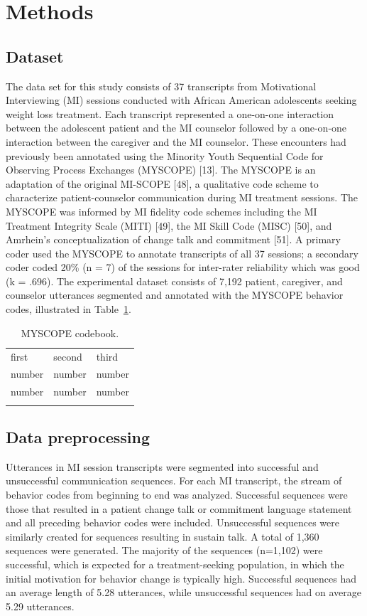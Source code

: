\section{Methods}
\label{sec:methods}
\subsection{Dataset}
\label{subsec:dataset}
The data set for this study consists of 37 transcripts from Motivational Interviewing (MI) sessions conducted with African American adolescents seeking weight loss treatment. Each transcript represented a one-on-one interaction between the adolescent patient and the MI counselor followed by a one-on-one interaction between the caregiver and the MI counselor. These encounters had previously been annotated using the Minority Youth Sequential Code for Observing Process Exchanges (MYSCOPE) [13]. The MYSCOPE is an adaptation of the original MI-SCOPE [48], a qualitative code scheme to characterize patient-counselor communication during MI treatment sessions. The MYSCOPE was informed by MI fidelity code schemes including the MI Treatment Integrity Scale (MITI) [49], the MI Skill Code (MISC) [50], and Amrhein’s conceptualization of change talk and commitment [51]. A primary coder used the MYSCOPE to annotate transcripts of all 37 sessions; a secondary coder coded 20\% (n = 7) of the sessions for inter-rater reliability which was good (k = .696). The experimental dataset consists of 7,192 patient, caregiver, and counselor utterances segmented and annotated with the MYSCOPE behavior codes, illustrated in Table~\ref{tab:codebook}.

\begin{table}
\caption{MYSCOPE codebook.}
\label{tab:codebook}   
\begin{tabularx}{\textwidth}{lll}
\hline\noalign{\smallskip}
first & second & third  \\
\noalign{\smallskip}\hline\noalign{\smallskip}
number & number & number \\
number & number & number \\
\noalign{\smallskip}\hline
\end{tabularx}
\end{table}

\subsection{Data preprocessing}
\label{subsec:datapreprocessing}
Utterances in MI session transcripts were segmented into successful and unsuccessful communication sequences. For each MI transcript, the stream of behavior codes from beginning to end was analyzed. Successful sequences were those that resulted in a patient change talk or commitment language statement and all preceding behavior codes were included. Unsuccessful sequences were similarly created for sequences resulting in sustain talk. A total of 1,360 sequences were generated. The majority of the sequences (n=1,102) were successful, which is expected for a treatment-seeking population, in which the initial motivation for behavior change is typically high. Successful sequences had an average length of 5.28 utterances, while unsuccessful sequences had on average 5.29 utterances. 

